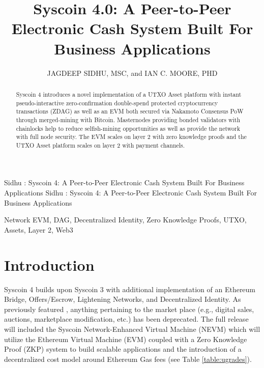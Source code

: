 \documentclass[peerreview]{ieeesyscoin}
\begin{document}
\linenumbers
\history{}

\title{\centering Syscoin 4.0: A Peer-to-Peer Electronic Cash System Built For Business Applications}
\author{\centering  \uppercase{Jagdeep Sidhu, MSc}, 
and \uppercase{Ian C. Moore, PhD}}

\address[1]{\centering Syscoin Core Developer, Blockchain Foundry Inc.(e-mail: jsidhu@blockchainfoundry.co)}
\address[2]{\centering  (e-mail: ic3moore@gmail.com)}
\tfootnote{}

\markboth
{Sidhu \headeretal: Syscoin 4: A Peer-to-Peer Electronic Cash System Built For Business Applications}
{Sidhu \headeretal: Syscoin 4: A Peer-to-Peer Electronic Cash System Built For Business Applications}

\corresp{}

\begin{abstract}
Syscoin 4 introduces a novel implementation of a UTXO Asset platform with instant pseudo-interactive zero-confirmation double-spend protected cryptocurrency transactions (ZDAG) as well as an EVM both secured via Nakamoto Consensus PoW through merged-mining with Bitcoin. Masternodes providing bonded validators with chainlocks help to reduce selfish-mining opportunities as well as provide the network with full node security. The EVM scales on layer 2 with zero knowledge proofs and the UTXO Asset platform scales on layer 2 with payment channels.
\end{abstract}

\begin{keywords}
Network EVM, DAG, Decentralized Identity, Zero Knowledge Proofs, UTXO, Assets, Layer 2, Web3
\end{keywords}

\titlepgskip=-15pt

\maketitle

\section{Introduction}
\label{sec:introduction}

Syscoin 4 builds upon Syscoin 3 with additional implementation of an Ethereum Bridge, Offers/Escrow, Lightening Networks, and Decentralized Identity. As previously featured \cite{Sida18}, anything pertaining to the market place (e.g., digital sales, auctions, marketplace modification, etc.) has been deprecated. The full release will included the Syscoin Network-Enhanced Virtual Machine (NEVM) which will utilize the Ethereum Virtual Machine (EVM) coupled with a Zero Knowledge Proof (ZKP) system to build scalable applications and the introduction of a decentralized cost model around Ethereum Gas fees (see Table \ref{table:ugrades}).
\end{document}
